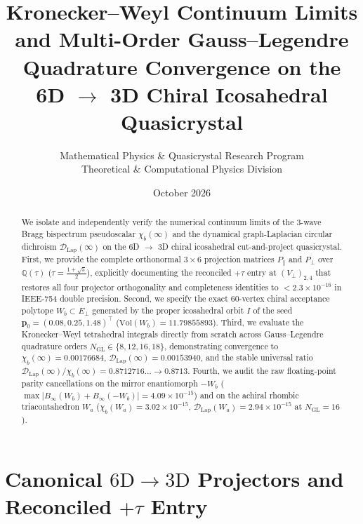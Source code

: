 \documentclass[11pt,a4paper]{article}
\title{\textbf{Kronecker--Weyl Continuum Limits and Multi-Order Gauss--Legendre Quadrature Convergence on the 6D $\to$ 3D Chiral Icosahedral Quasicrystal}}
\author{Mathematical Physics \& Quasicrystal Research Program \\ \small Theoretical \& Computational Physics Division}
\date{October 2026}
\begin{document}
\maketitle

\begin{abstract}
We isolate and independently verify the numerical continuum limits of the 3-wave Bragg bispectrum pseudoscalar $\chi_b(\infty)$ and the dynamical graph-Laplacian circular dichroism $\mathcal{D}_{\mathrm{Lap}}(\infty)$ on the 6D $\to$ 3D chiral icosahedral cut-and-project quasicrystal. First, we provide the complete orthonormal $3\times 6$ projection matrices $P_\parallel$ and $P_\perp$ over $\mathbb{Q}(\tau)$ ($\tau = \frac{1+\sqrt{5}}{2}$), explicitly documenting the reconciled $+\tau$ entry at $(V_\perp)_{2,4}$ that restores all four projector orthogonality and completeness identities to $< 2.3\times 10^{-16}$ in IEEE-754 double precision. Second, we specify the exact 60-vertex chiral acceptance polytope $W_b \subset E_\perp$ generated by the proper icosahedral orbit $I$ of the seed $\mathbf{p}_0 = (0.08, 0.25, 1.48)^\top$ ($\mathrm{Vol}(W_b) = 11.79855893$). Third, we evaluate the Kronecker--Weyl tetrahedral integrals directly from scratch across Gauss--Legendre quadrature orders $N_{\mathrm{GL}} \in \{8, 12, 16, 18\}$, demonstrating convergence to $\chi_b(\infty) = 0.00176684$, $\mathcal{D}_{\mathrm{Lap}}(\infty) = 0.00153940$, and the stable universal ratio $\mathcal{D}_{\mathrm{Lap}}(\infty)/\chi_b(\infty) = 0.8712716\dots \to 0.8713$. Fourth, we audit the raw floating-point parity cancellations on the mirror enantiomorph $-W_b$ ($\max |B_\infty(W_b)+B_\infty(-W_b)| = 4.09\times 10^{-15}$) and on the achiral rhombic triacontahedron $W_a$ ($\chi_b(W_a) = 3.02\times 10^{-15}$, $\mathcal{D}_{\mathrm{Lap}}(W_a) = 2.94\times 10^{-15}$ at $N_{\mathrm{GL}}=16$).
\end{abstract}

\section{Canonical $6\mathrm{D} \to 3\mathrm{D}$ Projectors and Reconciled $+\tau$ Entry}
\end{document}
